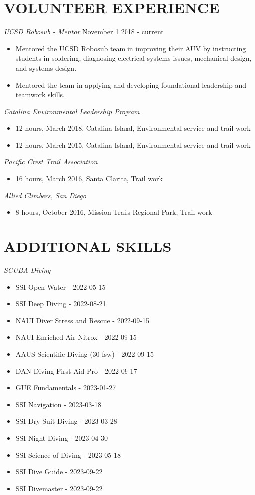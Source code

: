 \documentclass[line,margin]{res}
\begin{document}
\begin{resume}
\section{VOLUNTEER EXPERIENCE}
	{\sl UCSD Robosub - Mentor} \hfill November 1 2018 - current
		\begin{itemize}
			\item Mentored the UCSD Robosub team in improving their AUV by instructing students in soldering, diagnosing electrical systems issues, mechanical design, and systems design.
			\item Mentored the team in applying and developing foundational leadership and teamwork skills.
		\end{itemize}
	{\sl Catalina Environmental Leadership Program}
		\begin{itemize}
			\item 12 hours, March 2018, Catalina Island, Environmental service and trail work
			\item 12 hours, March 2015, Catalina Island, Environmental service and trail work
		\end{itemize}

	{\sl Pacific Crest Trail Association}
		\begin{itemize}
			\item 16 hours, March 2016, Santa Clarita, Trail work
		\end{itemize}

	{\sl Allied Climbers, San Diego}
		\begin{itemize}
			\item 8 hours, October 2016, Mission Trails Regional Park, Trail work
		\end{itemize}

\section{ADDITIONAL SKILLS}
	{\sl SCUBA Diving}\\
	    \begin{itemize}
			\item SSI Open Water - 2022-05-15
			\item SSI Deep Diving - 2022-08-21
			\item NAUI Diver Stress and Rescue - 2022-09-15
			\item NAUI Enriched Air Nitrox - 2022-09-15
			\item AAUS Scientific Diving (30 fsw) - 2022-09-15
			\item DAN Diving First Aid Pro - 2022-09-17
			\item GUE Fundamentals - 2023-01-27
			\item SSI Navigation - 2023-03-18
			\item SSI Dry Suit Diving - 2023-03-28
			\item SSI Night Diving - 2023-04-30
			\item SSI Science of Diving - 2023-05-18
			\item SSI Dive Guide - 2023-09-22
			\item SSI Divemaster - 2023-09-22
		\end{itemize}


\end{resume}
\end{document}

